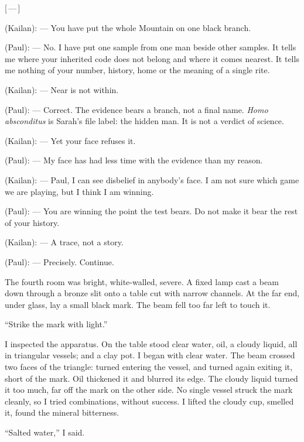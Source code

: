 \begin{room}
\centerline{[\,---\,]}

(Kailan): --- You have put the whole Mountain on one black branch.

(Paul): --- No. I have put one sample from one man beside other samples. It tells me where your inherited code does not belong and where it comes nearest. It tells me nothing of your number, history, home or the meaning of a single rite.

(Kailan): --- Near is not within.

(Paul): --- Correct. The evidence bears a branch, not a final name. \textit{Homo absconditus} is Sarah's file label: the hidden man. It is not a verdict of science.

(Kailan): --- Yet your face refuses it.

(Paul): --- My face has had less time with the evidence than my reason.

(Kailan): --- Paul, I can see disbelief in anybody's face. I am not sure which game we are playing, but I think I am winning.

(Paul): --- You are winning the point the test bears. Do not make it bear the rest of your history.

(Kailan): --- A trace, not a story.

(Paul): --- Precisely. Continue.

\end{room}

The fourth room was bright, white-walled, severe. A fixed lamp cast a beam down through a bronze slit onto a table cut with narrow channels. At the far end, under glass, lay a small black mark. The beam fell too far left to touch it.\par

``Strike the mark with light.''\par

I inspected the apparatus. On the table stood clear water, oil, a cloudy liquid, all in triangular vessels; and a clay pot. I began with clear water. The beam crossed two faces of the triangle: turned entering the vessel, and turned again exiting it, short of the mark. Oil thickened it and blurred its edge. The cloudy liquid turned it too much, far off the mark on the other side. No single vessel struck the mark cleanly, so I tried combinations, without success. I lifted the cloudy cup, smelled it, found the mineral bitterness.\par

``Salted water,'' I said.\par

